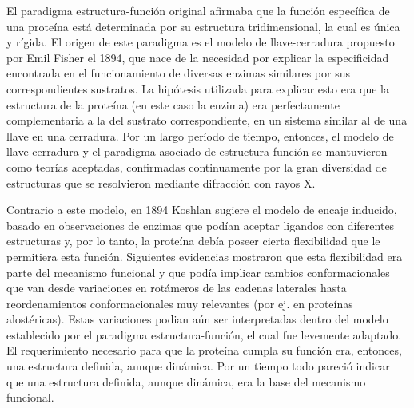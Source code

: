 El paradigma estructura-función original afirmaba que la función específica de una proteína está determinada por su estructura tridimensional, la cual es única y rígida. 
El origen de este paradigma es el modelo de llave-cerradura propuesto por Emil Fisher el 1894, 
que nace de la necesidad por  explicar la especificidad encontrada en el funcionamiento de diversas enzimas similares por sus correspondientes sustratos. 
La hipótesis utilizada para explicar esto era que la estructura de la proteína (en este caso la enzima) era perfectamente complementaria a la del sustrato correspondiente, en un sistema similar al de una llave en una cerradura.
Por un largo período de tiempo, entonces, el modelo de llave-cerradura y el paradigma asociado de estructura-función se mantuvieron como teorías aceptadas, confirmadas continuamente por la
gran diversidad de estructuras que se resolvieron mediante difracción con rayos X. 

Contrario a este modelo, en 1894 Koshlan sugiere el modelo de encaje inducido, basado en observaciones de enzimas que podían aceptar 
ligandos con diferentes estructuras y, por lo tanto, la proteína debía poseer cierta flexibilidad que le permitiera esta función.
Siguientes evidencias mostraron que esta flexibilidad era parte del mecanismo funcional y que podía implicar cambios conformacionales que van desde variaciones en rotámeros de las cadenas laterales hasta 
reordenamientos conformacionales muy relevantes (por ej. en proteínas alostéricas).
Estas variaciones podian aún ser interpretadas dentro del modelo establecido por el paradigma estructura-función, el cual fue levemente adaptado.
El requerimiento necesario para que la proteína cumpla su función era, entonces, una estructura definida, aunque dinámica. 
Por un tiempo todo pareció indicar que una estructura definida, aunque dinámica, era la base del mecanismo funcional.

